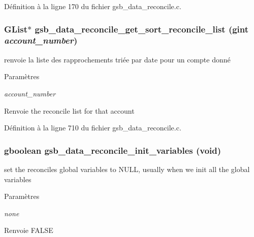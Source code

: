Définition à la ligne 170 du fichier gsb\_\-data\_\-reconcile.c.

\subsubsection[{gsb\_\-data\_\-reconcile\_\-get\_\-sort\_\-reconcile\_\-list}]{\setlength{\rightskip}{0pt plus 5cm}GList$\ast$ gsb\_\-data\_\-reconcile\_\-get\_\-sort\_\-reconcile\_\-list (gint {\em account\_\-number})}\label{gsb__data__reconcile_8c_a8224c264d9596777a0a701a31bd2487f}
renvoie la liste des rapprochements triée par date pour un compte donné


\begin{DoxyParams}{Paramètres}
\item[{\em account\_\-number}]\end{DoxyParams}
\begin{DoxyReturn}{Renvoie}
the reconcile list for that account 
\end{DoxyReturn}


Définition à la ligne 710 du fichier gsb\_\-data\_\-reconcile.c.

\subsubsection[{gsb\_\-data\_\-reconcile\_\-init\_\-variables}]{\setlength{\rightskip}{0pt plus 5cm}gboolean gsb\_\-data\_\-reconcile\_\-init\_\-variables (void)}\label{gsb__data__reconcile_8c_a92e5a9c9c1a907d6b2f7571426a910b6}
set the reconciles global variables to NULL, usually when we init all the global variables


\begin{DoxyParams}{Paramètres}
\item[{\em none}]\end{DoxyParams}
\begin{DoxyReturn}{Renvoie}
FALSE 
\end{DoxyReturn}


